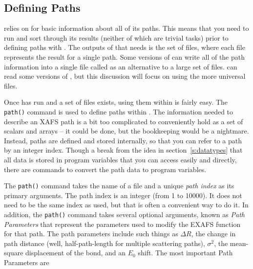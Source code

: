 \documentclass[11pt]{article}
\begin{document}
\subsection{Defining Paths}\label{s:xafs-process:path}

{\ifeffit} relies on {\feff} for basic information about all of its paths.
This means that you need to run {\feff} and sort through its results
(neither of which are trivial tasks) prior to defining paths with
{\ifeffit}.  The outputs of {\feff} that {\ifeffit} needs is the set of
{\feffndat} files, where each file represents the result for a single path.
Some versions of {\feff} can write all of the path information into a
single file called {\feffbin} as an alternative to a large set of
{\feffndat} files.  {\ifeffit} can read some versions of {\feffbin}, but
this discussion will focus on using the more universal {\feffndat} files.

Once {\feff} has run and a set of {\feffndat} files exists, using them
within {\ifeffit} is fairly easy.  The {\tt{path()}} command is used to
define paths within {\ifeffit}.  The information needed to describe an XAFS
path is a bit too complicated to conveniently hold as a set of {\ifeffit}
scalars and arrays -- it could be done, but the bookkeeping would be a
nightmare.  Instead, paths are defined and stored internally, so that you
can refer to a path by an integer index.  Though a break from the idea in
section~\ref{s:datatypes} that all data is stored in program variables that
you can access easily and directly, there are commands to convert the path
data to program variables.

The {\tt{path()}} command takes the name of a {\feffndat} file and a unique
{\ifeffit} {\emph{path index}} as its primary arguments.  The {\ifeffit}
path index is an integer (from 1 to 10000).  It does not need to be the
same index as {\feff} used, but that is often a convenient way to do it.
In addition, the {\tt{path()}} command takes several optional arguments,
known as {\emph{Path Parameters}\/} that represent the parameters used to
modify the EXAFS function for that path.  The path parameters include such
things as $\Delta R$, the change in path distance (well, half-path-length
for multiple scattering paths), $\sigma^2$, the mean-square displacement of
the bond, and an $E_0$ shift.  The most important Path Parameters are
\end{document}
